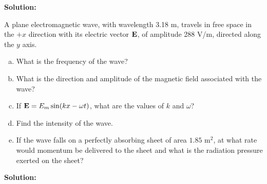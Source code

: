 \documentclass[11pt]{article}
\newcommand{\be}{\begin{enumerate}[a) ]}
\newcommand{\ee}{\end{enumerate}}
\begin{document}
\textbf{Solution:}\\

\clearpage

\begin{problem}[\P (P38.13)]
A plane electromagnetic wave, with wavelength 3.18 m, travels in free space in the $+x$ direction
with its electric vector $\mathbf{E}$, of amplitude 288 V/m, directed along the $y$ axis.
\be
\item What is the frequency of the wave?
\item What is the direction and amplitude of the magnetic field associated with the wave?
\item If $\mathbf{E} = E_m \sin(kx - \omega t)$, what are the values of $k$ and $\omega$?
\item Find the intensity of the wave.
\item If the wave falls on a perfectly absorbing sheet of area $1.85 \text{ m}^2$, at what rate would momentum
be delivered to the sheet and what is the radiation pressure exerted on the sheet?
\ee
\end{problem}


\textbf{Solution:}\\

\clearpage
\end{document}
